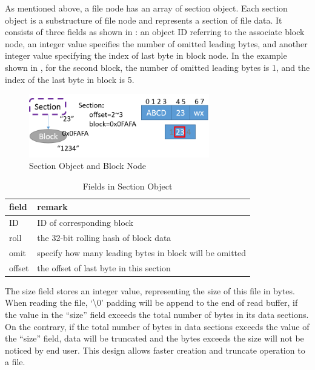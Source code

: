     As mentioned above, a file node has an array of section object. Each section object is a substructure of file node and represents a section of file data. It consists of three fields as shown in : an object ID referring to the associate block node, an integer value specifies the number of omitted leading bytes, and another integer value specifying the index of last byte in block node. In the example shown in , for the second block, the number of omitted leading bytes is 1, and the index of the last byte in block is 5.

\begin{figure}[t]
\centering
\includegraphics[width=0.7\textwidth]{Chapter-3/figs/fig9.png}
\caption{Section Object and Block Node}
\label{fig:section_and_block}
\end{figure}

\begin{table}[t]
\begin{center}
\caption{Fields in Section Object}
\begin{tabular}{ll}
\toprule
field & remark\\
\midrule
ID & ID of corresponding block\\
roll & the 32-bit rolling hash of block data\\
omit & specify how many leading bytes in block will be omitted\\
offset & the offset of last byte in this section\\
\bottomrule
\end{tabular}
\end{center}
\label{tab:section_fields}
\end{table}

    The size field stores an integer value, representing the size of this file in bytes. When reading the file, `\textbackslash0' padding will be append to the end of read buffer, if the value in the ``size'' field exceeds the total number of bytes in its data sections. On the contrary, if the total number of bytes in data sections exceeds the value of the ``size'' field, data will be truncated and the bytes exceeds the size will not be noticed by end user. This design allows faster creation and truncate operation to a file.


